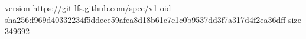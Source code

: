 version https://git-lfs.github.com/spec/v1
oid sha256:f969d40332234f5ddeee59afea8d18b61c7c1c0b9537dd3f7a317d4f2ea36dff
size 349692
